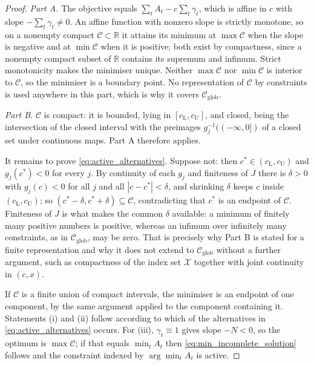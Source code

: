 \documentclass[11pt]{article}
\theoremstyle{definition}
\newcommand{\R}{\mathbb{R}}
\begin{document}
\begin{proof}
\emph{Part A.} The objective equals $\sum_tA_t-c\sum_t\gamma_t$, which is affine in $c$ with slope $-\sum_t\gamma_t\ne0$. An affine function with nonzero slope is strictly monotone, so on a nonempty compact $\mathcal C\subset\R$ it attains its minimum at $\max\mathcal C$ when the slope is negative and at $\min\mathcal C$ when it is positive; both exist by compactness, since a nonempty compact subset of $\R$ contains its supremum and infimum. Strict monotonicity makes the minimiser unique. Neither $\max\mathcal C$ nor $\min\mathcal C$ is interior to $\mathcal C$, so the minimiser is a boundary point. No representation of $\mathcal C$ by constraints is used anywhere in this part, which is why it covers $\mathcal C_{\text{glob}}$.

\emph{Part B.} $\mathcal C$ is compact: it is bounded, lying in $[c_{\mathrm L},c_{\mathrm U}]$, and closed, being the intersection of the closed interval with the preimages $g_j^{-1}((-\infty,0])$ of a closed set under continuous maps. Part A therefore applies.

It remains to prove \eqref{eq:active_alternatives}. Suppose not: then $c^*\in(c_{\mathrm L},c_{\mathrm U})$ and $g_j(c^*)<0$ for every $j$. By continuity of each $g_j$ and finiteness of $J$ there is $\delta>0$ with $g_j(c)<0$ for all $j$ and all $|c-c^*|<\delta$, and shrinking $\delta$ keeps $c$ inside $(c_{\mathrm L},c_{\mathrm U})$; so $(c^*-\delta,c^*+\delta)\subseteq\mathcal C$, contradicting that $c^*$ is an endpoint of $\mathcal C$. Finiteness of $J$ is what makes the common $\delta$ available: a minimum of finitely many positive numbers is positive, whereas an infimum over infinitely many constraints, as in $\mathcal C_{\text{glob}}$, may be zero. That is precisely why Part B is stated for a finite representation and why it does not extend to $\mathcal C_{\text{glob}}$ without a further argument, such as compactness of the index set $\mathcal X$ together with joint continuity in $(c,x)$.

If $\mathcal C$ is a finite union of compact intervals, the minimiser is an endpoint of one component, by the same argument applied to the component containing it. Statements (i) and (ii) follow according to which of the alternatives in \eqref{eq:active_alternatives} occurs. For (iii), $\gamma_t\equiv1$ gives slope $-N<0$, so the optimum is $\max\mathcal C$; if that equals $\min_tA_t$ then \eqref{eq:min_incomplete_solution} follows and the constraint indexed by $\arg\min_tA_t$ is active.
\end{proof}
\end{document}
